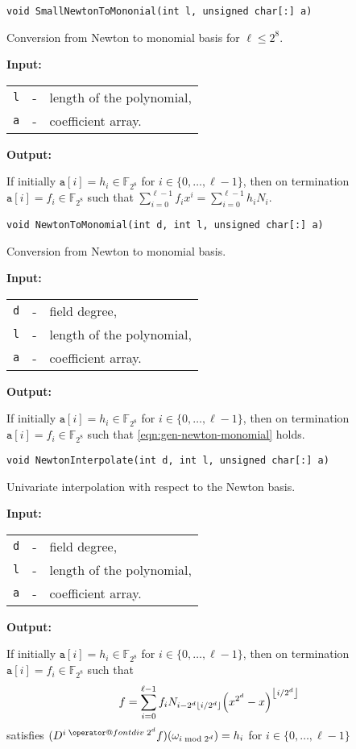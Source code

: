 \documentclass{amsart}
\makeatletter
\newcommand{\floor}[1]{\left\lfloor #1\right\rfloor}
\newcommand{\F}{\mathbb{F}}
\newcommand{\Input}{\textbf{Input:}}
\newcommand{\Output}{\textbf{Output:}}
\newcommand*{\bdiv}{%
	\nonscript\mskip-\medmuskip\mkern5mu%
	\mathbin{\operator@font div}\penalty900\mkern5mu%
	\nonscript\mskip-\medmuskip
}
\let\originalleft\left
\let\originalright\right
\renewcommand{\left}{\mathopen{}\mathclose\bgroup\originalleft}
\renewcommand{\right}{\aftergroup\egroup\originalright}
\newenvironment{inputs}{\Input\par\begin{tabular}{@{}rcl}}{\end{tabular}}
\newenvironment{outputs}{\Output\par}{}
\makeatother
\begin{document}
\texttt{void SmallNewtonToMononial(int l, unsigned char[:]\ a)}

Conversion from Newton to monomial basis for $\ell\leq 2^8$.

\begin{inputs}
	\texttt{l} & - & length of the polynomial, \\
	\texttt{a} & - & coefficient array.
\end{inputs}

\begin{outputs}
	If initially $\texttt{a}[i]=h_i\in\F_{2^8}$ for $i\in\{0,\dotsc,\ell-1\}$, then
	on termination $\texttt{a}[i]=f_i\in\F_{2^8}$ such that
	$\sum^{\ell-1}_{i=0}f_ix^i=\sum^{\ell-1}_{i=0}h_iN_i$.
\end{outputs}

\texttt{void NewtonToMonomial(int d, int l, unsigned char[:]\ a)}

Conversion from Newton to monomial basis.

\begin{inputs}
	\texttt{d} & - & field degree,             \\
	\texttt{l} & - & length of the polynomial, \\
	\texttt{a} & - & coefficient array.
\end{inputs}

\begin{outputs}
	If initially $\texttt{a}[i]=h_i\in\F_{2^8}$ for $i\in\{0,\dotsc,\ell-1\}$, then
	on termination $\texttt{a}[i]=f_i\in\F_{2^8}$ such that
	\eqref{eqn:gen-newton-monomial} holds.
\end{outputs}

\texttt{void NewtonInterpolate(int d, int l, unsigned char[:]\ a)}

Univariate interpolation with respect to the Newton basis.

\begin{inputs}
	\texttt{d} & - & field degree,             \\
	\texttt{l} & - & length of the polynomial, \\
	\texttt{a} & - & coefficient array.
\end{inputs}

\begin{outputs}
	If initially $\texttt{a}[i]=h_i\in\F_{2^8}$ for $i\in\{0,\dotsc,\ell-1\}$, then
	on termination $\texttt{a}[i]=f_i\in\F_{2^8}$ such that
	\begin{equation}\label{eqn:univariate-newton}
		f
		=
		\sum^{\ell-1}_{i=0}
		f_i
		N_{i-2^d\floor{i/2^d}}
		\left(x^{2^d}-x\right)^{\floor{i/2^d}}
	\end{equation}
	satisfies $(D^{i\bdiv{2^d}}f)(\omega_{i\bmod{2^d}})=h_i$ for
	$i\in\{0,\dotsc,\ell-1\}$	
\end{outputs}
\end{document}
